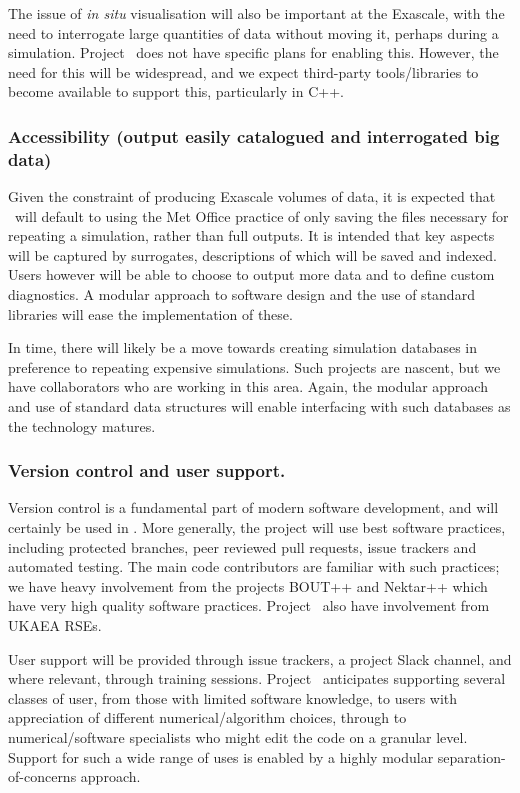 The issue of \emph{in situ} visualisation will also be important at the Exascale,
with the need to interrogate large quantities of data without moving it,
perhaps during a simulation.
Project \nep \ does not have specific plans for enabling this.
However, the need for this will be widespread, and we expect third-party
tools/libraries to become available to support this, particularly in C++.

\subsubsection{Accessibility (output easily catalogued and interrogated  big data)}
Given the constraint of producing Exascale volumes of data,
it is expected that \nep\ will default to using the Met Office practice of only
saving the files necessary for repeating a simulation, rather than full
outputs.
It is intended that key aspects will be captured by surrogates, descriptions of
which will be saved and indexed.
Users however will be able to choose to output more data and to define
custom diagnostics.
A modular approach to software design and the use of standard libraries will
ease the implementation of these.

In time, there will likely be a move towards creating
simulation databases in preference to repeating expensive simulations.
Such projects are nascent, but we have collaborators who are working in this
area.
Again, the modular approach and use of standard data structures will enable
interfacing with such databases as the technology matures.


\subsubsection{Version control and user support.}
Version control is a fundamental part of modern software development, and will
certainly be used in \nep.
More generally, the project will use best software practices, including
protected branches, peer reviewed pull requests, issue trackers and automated
testing.
The main code contributors are familiar with such practices; we have heavy
involvement from the projects BOUT++ and Nektar++ which have very high quality
software practices.
Project \nep \ also have involvement from UKAEA RSEs.

User support will be provided through issue trackers, a project Slack channel,
and where relevant, through training sessions.
Project \nep \ anticipates supporting several classes of user, from
those with limited software knowledge,
to users with appreciation of different numerical/algorithm choices,
through to numerical/software specialists who might edit the code on a granular
level.
Support for such a wide range of uses is enabled by a highly modular
separation-of-concerns approach.


